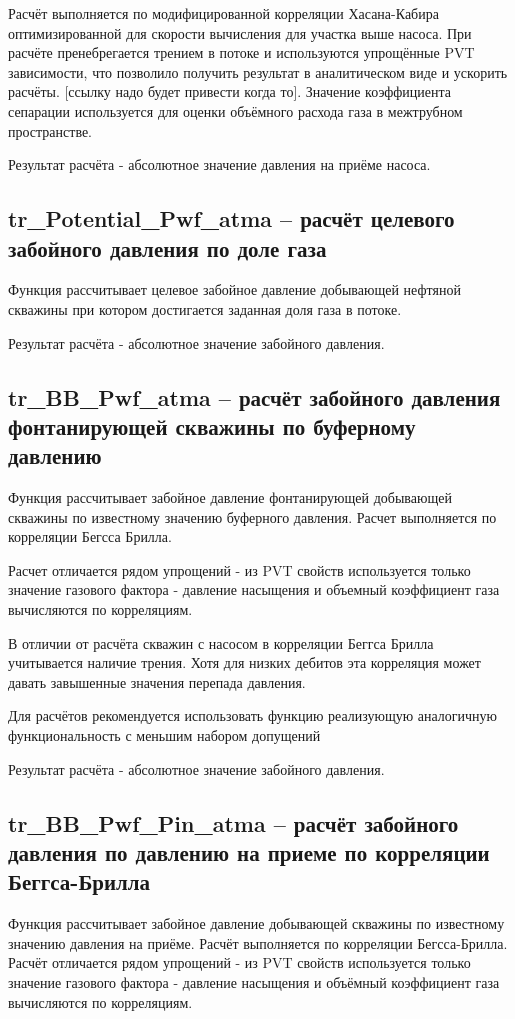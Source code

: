 \documentclass[]{scrreprt}
\begin{document}
Расчёт выполняется по модифицированной корреляции Хасана-Кабира оптимизированной для скорости вычисления для участка выше насоса. При расчёте пренебрегается трением в потоке и используются упрощённые PVT зависимости, что позволило получить результат в аналитическом виде и ускорить расчёты. [ссылку надо будет привести когда то]. Значение коэффициента сепарации используется для оценки объёмного расхода газа в межтрубном пространстве. 

Результат расчёта - абсолютное значение давления на приёме насоса. 



\subsection{tr\_Potential\_Pwf\_atma – расчёт целевого забойного давления по доле газа}
Функция рассчитывает целевое забойное давление добывающей нефтяной скважины при котором достигается заданная доля газа в потоке.

Результат расчёта - абсолютное значение забойного давления. 

\subsection{tr\_BB\_Pwf\_atma – расчёт забойного давления фонтанирующей скважины по буферному давлению}
Функция рассчитывает забойное давление фонтанирующей добывающей скважины по известному значению буферного давления. Расчет выполняется по корреляции Бегсса Брилла. 

Расчет отличается рядом упрощений - из PVT свойств используется только значение газового фактора - давление насыщения и объемный коэффициент газа вычисляются по корреляциям. 

В отличии от расчёта скважин с насосом в корреляции Беггса Брилла учитывается наличие трения. Хотя для низких дебитов эта корреляция может давать завышенные значения перепада давления. 

Для расчётов рекомендуется использовать функцию \unf реализующую аналогичную функциональность с меньшим набором допущений

Результат расчёта - абсолютное значение забойного давления. 

\subsection{tr\_BB\_Pwf\_Pin\_atma – расчёт забойного давления по давлению на приеме по корреляции Беггса-Брилла}
Функция рассчитывает забойное давление  добывающей скважины по известному значению давления на приёме. Расчёт выполняется по корреляции Бегсса-Брилла. 
Расчёт отличается рядом упрощений - из PVT свойств используется только значение газового фактора - давление насыщения и объёмный коэффициент газа вычисляются по корреляциям. 
\end{document}
